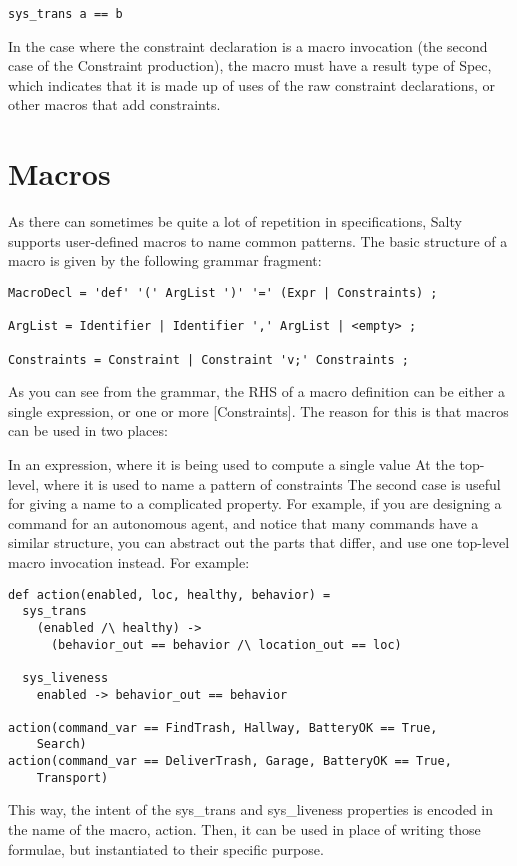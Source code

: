 \begin{lstlisting}
sys_trans a == b
\end{lstlisting}

In the case where the constraint declaration is a macro invocation (the second case of the Constraint production), the macro must have a result type of Spec, which indicates that it is made up of uses of the raw constraint declarations, or other macros that add constraints.

\section{Macros}

As there can sometimes be quite a lot of repetition in specifications, Salty supports user-defined macros to name common patterns. The basic structure of a macro is given by the following grammar fragment:
\begin{lstlisting}
MacroDecl = 'def' '(' ArgList ')' '=' (Expr | Constraints) ;

ArgList = Identifier | Identifier ',' ArgList | <empty> ;

Constraints = Constraint | Constraint 'v;' Constraints ;
\end{lstlisting}

As you can see from the grammar, the RHS of a macro definition can be either a single expression, or one or more [Constraints]. The reason for this is that macros can be used in two places:

In an expression, where it is being used to compute a single value
At the top-level, where it is used to name a pattern of constraints
The second case is useful for giving a name to a complicated property. For example, if you are designing a command for an autonomous agent, and notice that many commands have a similar structure, you can abstract out the parts that differ, and use one top-level macro invocation instead. For example:

\begin{lstlisting}
def action(enabled, loc, healthy, behavior) =
  sys_trans
    (enabled /\ healthy) ->
      (behavior_out == behavior /\ location_out == loc)

  sys_liveness
    enabled -> behavior_out == behavior

action(command_var == FindTrash, Hallway, BatteryOK == True,
    Search)
action(command_var == DeliverTrash, Garage, BatteryOK == True,
    Transport)
\end{lstlisting}
This way, the intent of the sys\_trans and sys\_liveness properties is encoded in the name of the macro, action. Then, it can be used in place of writing those formulae, but instantiated to their specific purpose.
